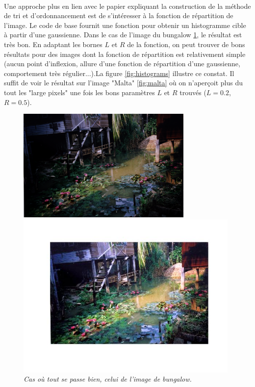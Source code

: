 \documentclass{article}
\begin{document}
\paragraph*{}
Une approche plus en lien avec le papier expliquant la construction de la méthode de tri et d'ordonnancement est de s'intéresser à la fonction de répartition de l'image. Le code de base fournit une fonction pour obtenir un histogramme cible à partir d'une gaussienne. Dans le cas de l'image du bungalow \ref {fig:bungalow}, le résultat est très bon. En adaptant les bornes $L$ et $R$ de la fonction, on peut trouver de bons résultats pour des images dont la fonction de répartition est relativement simple (aucun point d'inflexion, allure d'une fonction de répartition d'une gaussienne, comportement très régulier...).La figure \ref{fig:histograms} illustre ce constat. Il suffit de voir le résultat sur l'image "Malta" \ref{fig:malta} où on n'aperçoit plus du tout les "large pixels" une fois les bons paramètres $L$ et $R$ trouvés ($L = 0.2$, $R = 0.5$).

\begin{figure}[!hbt]
\centering
\begin{minipage}{0.5\textwidth}
\centering
\includegraphics[width=0.77\textwidth]{../pictures/bungalow.png}
\end{minipage}%
\begin{minipage}{0.5\textwidth}
\centering
\includegraphics[width=0.98\textwidth]{images/p3_bungalow_xx.jpg}
\end{minipage}
\caption{\textit{Cas où tout se passe bien, celui de l'image de bungalow.}}
\label{fig:bungalow}
\end{figure}
\end{document}
